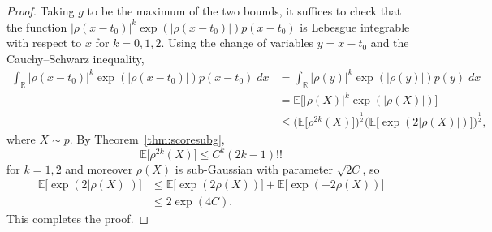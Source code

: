 \documentclass[aos]{imsart}
\newcommand{\R}{\mathbb{R}}
\newcommand{\E}{\mathbb{E}}
\begin{document}
\begin{proof}
		Taking $g$ to be the maximum of the two bounds, it suffices to check that the function $|\rho(x-t_0)|^k\exp(|\rho(x-t_0)|)p(x-t_0)$ is Lebesgue integrable with respect to $x$ for $k=0,1,2$. Using the change of variables $y=x-t_0$ and the Cauchy--Schwarz inequality,
		\begin{align*}
			\int_\R |\rho(x-t_0)|^k\exp(|\rho(x-t_0)|)p(x-t_0)\; dx &= \int_\R |\rho(y)|^k\exp(|\rho(y)|)p(y)\; dx\\
			&= \E\big[|\rho(X)|^k\exp(|\rho(X)|)\big]\\
			&\leq \Big(\E\big[\rho^{2k}(X)\big] \Big)^{\frac12} \Big(\E\big[\exp(2|\rho(X)|)\big] \Big)^{\frac12},
		\end{align*} 
		where $X\sim p$. By Theorem~\ref{thm:scoresubg}, \begin{equation*}
			\E\big[\rho^{2k}(X)\big] \leq C^k (2k-1)!!
		\end{equation*} for $k=1,2$ and moreover $\rho(X)$ is sub-Gaussian with parameter $\sqrt{2C}$, so \begin{align*}
			\E\big[\exp(2|\rho(X)|)\big] &\leq \E\big[\exp(2\rho(X))\big] + \E\big[\exp(-2\rho(X))\big]\\
			&\leq 2\exp(4C).
		\end{align*}
		This completes the proof.
	\end{proof}
	
\end{document}
